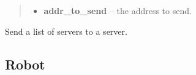 \documentclass[letterpaper,10pt,english]{sphinxmanual}
\begin{document}
\begin{fulllineitems}
\begin{fulllineitems}
\begin{quote}
\begin{description}
\begin{itemize}
\item {} 
\textbf{addr\_to\_send} -- the address to send.

\end{itemize}

\end{description}\end{quote}

\end{fulllineitems}


\begin{fulllineitems}
\label{api:network.Network.send_list_servers}
Send a list of servers to a server.

\end{fulllineitems}


\end{fulllineitems}



\subsection{Robot}
\label{api:robot}
\end{document}
